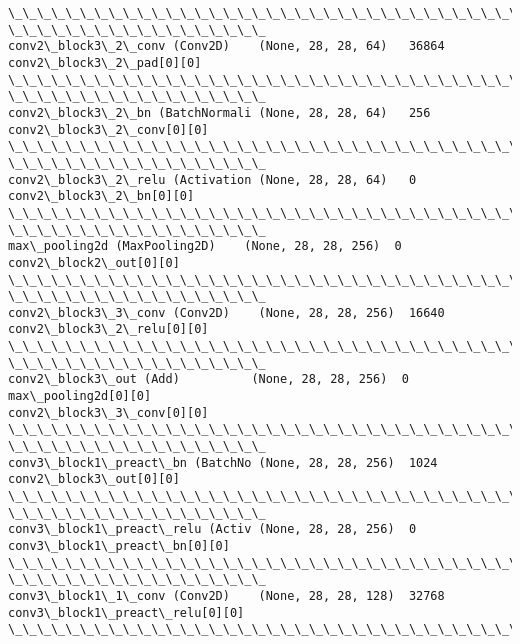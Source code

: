 \documentclass[11pt]{article}
\begin{document}
\begin{Verbatim}[commandchars=\\\{\}]
\_\_\_\_\_\_\_\_\_\_\_\_\_\_\_\_\_\_\_\_\_\_\_\_\_\_\_\_\_\_\_\_\_\_\_\_\_\_\_\_\_\_\_\_\_\_\_\_\_\_\_\_\_\_\_\_\_\_\_\_\_\_\_\_\_\_\_\_\_\_\_\_\_\_\_\_\_\_\_\_
\_\_\_\_\_\_\_\_\_\_\_\_\_\_\_\_\_\_
conv2\_block3\_2\_conv (Conv2D)    (None, 28, 28, 64)   36864
conv2\_block3\_2\_pad[0][0]
\_\_\_\_\_\_\_\_\_\_\_\_\_\_\_\_\_\_\_\_\_\_\_\_\_\_\_\_\_\_\_\_\_\_\_\_\_\_\_\_\_\_\_\_\_\_\_\_\_\_\_\_\_\_\_\_\_\_\_\_\_\_\_\_\_\_\_\_\_\_\_\_\_\_\_\_\_\_\_\_
\_\_\_\_\_\_\_\_\_\_\_\_\_\_\_\_\_\_
conv2\_block3\_2\_bn (BatchNormali (None, 28, 28, 64)   256
conv2\_block3\_2\_conv[0][0]
\_\_\_\_\_\_\_\_\_\_\_\_\_\_\_\_\_\_\_\_\_\_\_\_\_\_\_\_\_\_\_\_\_\_\_\_\_\_\_\_\_\_\_\_\_\_\_\_\_\_\_\_\_\_\_\_\_\_\_\_\_\_\_\_\_\_\_\_\_\_\_\_\_\_\_\_\_\_\_\_
\_\_\_\_\_\_\_\_\_\_\_\_\_\_\_\_\_\_
conv2\_block3\_2\_relu (Activation (None, 28, 28, 64)   0
conv2\_block3\_2\_bn[0][0]
\_\_\_\_\_\_\_\_\_\_\_\_\_\_\_\_\_\_\_\_\_\_\_\_\_\_\_\_\_\_\_\_\_\_\_\_\_\_\_\_\_\_\_\_\_\_\_\_\_\_\_\_\_\_\_\_\_\_\_\_\_\_\_\_\_\_\_\_\_\_\_\_\_\_\_\_\_\_\_\_
\_\_\_\_\_\_\_\_\_\_\_\_\_\_\_\_\_\_
max\_pooling2d (MaxPooling2D)    (None, 28, 28, 256)  0
conv2\_block2\_out[0][0]
\_\_\_\_\_\_\_\_\_\_\_\_\_\_\_\_\_\_\_\_\_\_\_\_\_\_\_\_\_\_\_\_\_\_\_\_\_\_\_\_\_\_\_\_\_\_\_\_\_\_\_\_\_\_\_\_\_\_\_\_\_\_\_\_\_\_\_\_\_\_\_\_\_\_\_\_\_\_\_\_
\_\_\_\_\_\_\_\_\_\_\_\_\_\_\_\_\_\_
conv2\_block3\_3\_conv (Conv2D)    (None, 28, 28, 256)  16640
conv2\_block3\_2\_relu[0][0]
\_\_\_\_\_\_\_\_\_\_\_\_\_\_\_\_\_\_\_\_\_\_\_\_\_\_\_\_\_\_\_\_\_\_\_\_\_\_\_\_\_\_\_\_\_\_\_\_\_\_\_\_\_\_\_\_\_\_\_\_\_\_\_\_\_\_\_\_\_\_\_\_\_\_\_\_\_\_\_\_
\_\_\_\_\_\_\_\_\_\_\_\_\_\_\_\_\_\_
conv2\_block3\_out (Add)          (None, 28, 28, 256)  0
max\_pooling2d[0][0]
conv2\_block3\_3\_conv[0][0]
\_\_\_\_\_\_\_\_\_\_\_\_\_\_\_\_\_\_\_\_\_\_\_\_\_\_\_\_\_\_\_\_\_\_\_\_\_\_\_\_\_\_\_\_\_\_\_\_\_\_\_\_\_\_\_\_\_\_\_\_\_\_\_\_\_\_\_\_\_\_\_\_\_\_\_\_\_\_\_\_
\_\_\_\_\_\_\_\_\_\_\_\_\_\_\_\_\_\_
conv3\_block1\_preact\_bn (BatchNo (None, 28, 28, 256)  1024
conv2\_block3\_out[0][0]
\_\_\_\_\_\_\_\_\_\_\_\_\_\_\_\_\_\_\_\_\_\_\_\_\_\_\_\_\_\_\_\_\_\_\_\_\_\_\_\_\_\_\_\_\_\_\_\_\_\_\_\_\_\_\_\_\_\_\_\_\_\_\_\_\_\_\_\_\_\_\_\_\_\_\_\_\_\_\_\_
\_\_\_\_\_\_\_\_\_\_\_\_\_\_\_\_\_\_
conv3\_block1\_preact\_relu (Activ (None, 28, 28, 256)  0
conv3\_block1\_preact\_bn[0][0]
\_\_\_\_\_\_\_\_\_\_\_\_\_\_\_\_\_\_\_\_\_\_\_\_\_\_\_\_\_\_\_\_\_\_\_\_\_\_\_\_\_\_\_\_\_\_\_\_\_\_\_\_\_\_\_\_\_\_\_\_\_\_\_\_\_\_\_\_\_\_\_\_\_\_\_\_\_\_\_\_
\_\_\_\_\_\_\_\_\_\_\_\_\_\_\_\_\_\_
conv3\_block1\_1\_conv (Conv2D)    (None, 28, 28, 128)  32768
conv3\_block1\_preact\_relu[0][0]
\_\_\_\_\_\_\_\_\_\_\_\_\_\_\_\_\_\_\_\_\_\_\_\_\_\_\_\_\_\_\_\_\_\_\_\_\_\_\_\_\_\_\_\_\_\_\_\_\_\_\_\_\_\_\_\_\_\_\_\_\_\_\_\_\_\_\_\_\_\_\_\_\_\_\_\_\_\_\_\_

\end{Verbatim}
\end{document}
